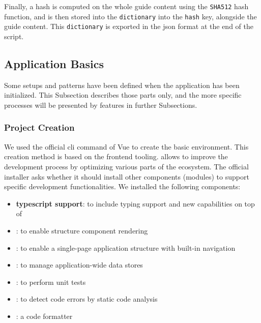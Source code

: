 Finally, a hash is computed on the whole guide content using the \texttt{SHA512} hash function, and is then stored into the \texttt{dictionary} into the \texttt{hash} key, alongside the guide content. This \texttt{dictionary} is exported in the \gls{json} format at the end of the script. 

\newpage

\subsection{Application Basics}
\label{subsec:app_implementation_basics}

Some setups and patterns have been defined when the application has been initialized. This Subsection describes those parts only, and the more specific processes will be presented by features in further Subsections.

\subsubsection{Project Creation}
\label{subsubsec:app_implementation_basics_creation}

We used the official \gls{cli} command of Vue to create the basic environment. This creation method is based on the  \gls{frontend} tooling.  allows to improve the development process by optimizing various parts of the  ecosystem. The official installer asks whether it should install other components (modules) to support specific development functionalities. We installed the following components:
\begin{itemize}
	\item \textbf{\gls{typescript} support}: to include typing support and new capabilities on top of 
	\item \textbf{}: to enable structure component rendering
	\item \textbf{}: to enable a single-page application structure with built-in navigation
	\item \textbf{}: to manage application-wide data stores
	\item \textbf{}: to perform unit tests
	\item \textbf{}: to detect code errors by static code analysis
	\item \textbf{}: a code formatter
\end{itemize}

